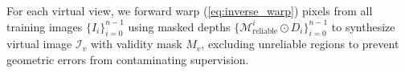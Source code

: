 For each virtual view, we forward warp (\cref{eq:inverse_warp}) pixels from all training images $\{I_i\}_{i=0}^{n-1}$ using masked depths $\{\mathcal{M}_{\text{reliable}}^{i} \odot D_i\}_{i=0}^{n-1}$ to synthesize virtual image $\mathcal{I}_{v}$ with validity mask $M_v$, excluding unreliable regions to prevent geometric errors from contaminating supervision.



\begin{table}[t]
  \centering
  \caption{\textbf{Quantitative comparisons on LLFF~\cite{mildenhall2019local} dataset under sparse view settings. }}
  \label{tab:llff_results}
\end{table}
